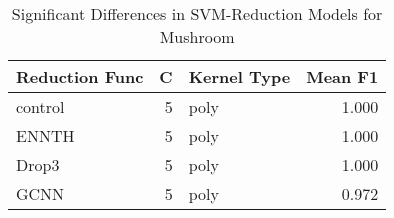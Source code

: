\begin{table}
\centering
\caption{Significant Differences in SVM-Reduction Models for Mushroom}
\label{tab:svm_reduction_significant_pairs_mushroom}
\begin{tabular}{lrlr}
\toprule
Reduction Func & C & Kernel Type & Mean F1 \\
\midrule
control & 5 & poly & 1.000 \\
ENNTH & 5 & poly & 1.000 \\
Drop3 & 5 & poly & 1.000 \\
GCNN & 5 & poly & 0.972 \\
\bottomrule
\end{tabular}
\end{table}
